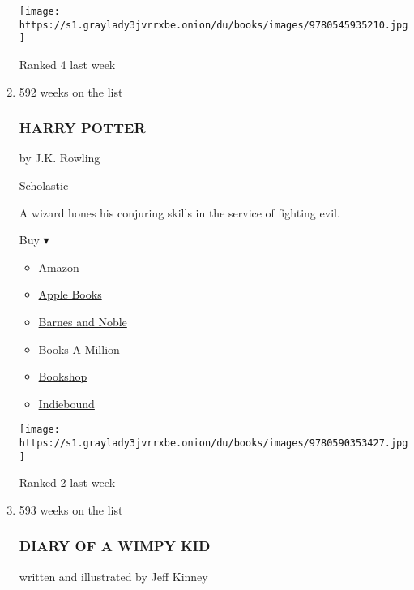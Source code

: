 \begin{enumerate}
  \texttt{[image: https://s1.graylady3jvrrxbe.onion/du/books/images/9780545935210.jpg]}

  Ranked 4 last week
\item
  592 weeks on the list

  \hypertarget{harry-potter}{%
  \subsubsection{HARRY POTTER}\label{harry-potter}}

  by J.K. Rowling

  Scholastic

  A wizard hones his conjuring skills in the service of fighting evil.

  Buy ▾

  \begin{itemize}
  \tightlist
  \item
    \href{http://www.amazon.com/Harry-Potter-And-Order-Phoenix/dp/0439358078?tag=NYTBS-20}{Amazon}
  \item
    \href{https://du-gae-books-dot-nyt-du-prd.appspot.com/buy?title=HARRY+POTTER\&author=JK+Rowling}{Apple
    Books}
  \item
    \href{https://www.anrdoezrs.net/click-7990613-11819508?url=https\%3A\%2F\%2Fwww.barnesandnoble.com\%2Fw\%2F\%3Fean\%3D9780545791427}{Barnes
    and Noble}
  \item
    \href{https://www.anrdoezrs.net/click-7990613-35140?url=https\%3A\%2F\%2Fwww.booksamillion.com\%2Fp\%2FHARRY\%2BPOTTER\%2FJK\%2BRowling\%2F9780545791427}{Books-A-Million}
  \item
    \href{https://bookshop.org/a/3546/9780545791427}{Bookshop}
  \item
    \href{https://www.indiebound.org/book/9780545791427?aff=NYT}{Indiebound}
  \end{itemize}

  \texttt{[image: https://s1.graylady3jvrrxbe.onion/du/books/images/9780590353427.jpg]}

  Ranked 2 last week
\item
  593 weeks on the list

  \hypertarget{diary-of-a-wimpy-kid}{%
  \subsubsection{DIARY OF A WIMPY KID}\label{diary-of-a-wimpy-kid}}

  written and illustrated by Jeff Kinney


\end{enumerate}
